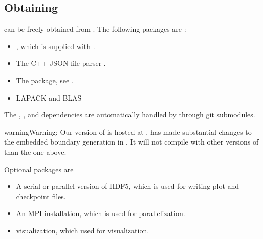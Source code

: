 \documentclass[letterpaper,10pt,english]{sphinxmanual}
\begin{document}
\subsection{Obtaining }
\label{\detokenize{Base/Installation:obtaining-chombo-discharge}}
 can be freely obtained from .
The following packages are :
\begin{itemize}
\item {} 
, which is supplied with .

\item {} 
The C++ JSON file parser .

\item {} 
The  package, see .

\item {} 
LAPACK and BLAS

\end{itemize}

The , , and  dependencies are automatically handled by  through git submodules.

\begin{sphinxadmonition}{warning}{Warning:}
Our version of  is hosted at .
 has made substantial changes to the embedded boundary generation in .
It will not compile with other versions of  than the one above.
\end{sphinxadmonition}

Optional packages are
\begin{itemize}
\item {} 
A serial or parallel version of HDF5, which is used for writing plot and checkpoint files.

\item {} 
An MPI installation, which is used for parallelization.

\item {} 
 visualization, which used for visualization.

\end{itemize}
\end{document}
